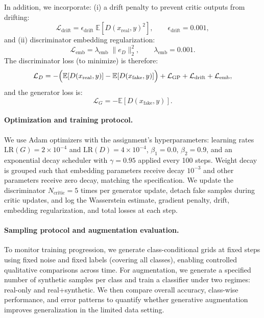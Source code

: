 In addition, we incorporate:
(i) a drift penalty to prevent critic outputs from drifting:
\[
\mathcal{L}_{\mathrm{drift}}=\epsilon_{\mathrm{drift}}\;\mathbb{E}\left[D(x_{\mathrm{real}},y)^2\right],\qquad \epsilon_{\mathrm{drift}}=0.001,
\]
and (ii) discriminator embedding regularization:
\[
\mathcal{L}_{\mathrm{emb}}=\lambda_{\mathrm{emb}}\;\|e_D\|_2^2,\qquad \lambda_{\mathrm{emb}}=0.001.
\]
The discriminator loss (to minimize) is therefore:
\[
\mathcal{L}_D=
-\Bigl(\mathbb{E}[D(x_{\mathrm{real}},y)]-\mathbb{E}[D(x_{\mathrm{fake}},y)]\Bigr)
+\mathcal{L}_{\mathrm{GP}}+\mathcal{L}_{\mathrm{drift}}+\mathcal{L}_{\mathrm{emb}},
\]
and the generator loss is:
\[
\mathcal{L}_G=-\mathbb{E}[D(x_{\mathrm{fake}},y)].
\]

\paragraph{Optimization and training protocol.}
We use Adam optimizers with the assignment's hyperparameters: learning rates $\mathrm{LR}(G)=2\times10^{-4}$ and $\mathrm{LR}(D)=4\times10^{-4}$, $\beta_1=0.0$, $\beta_2=0.9$, and an exponential decay scheduler with $\gamma=0.95$ applied every 100 steps. Weight decay is grouped such that embedding parameters receive decay $10^{-3}$ and other parameters receive zero decay, matching the specification. We update the discriminator $N_{\mathrm{critic}}=5$ times per generator update, detach fake samples during critic updates, and log the Wasserstein estimate, gradient penalty, drift, embedding regularization, and total losses at each step.

\paragraph{Sampling protocol and augmentation evaluation.}
To monitor training progression, we generate class-conditional grids at fixed steps using fixed noise and fixed labels (covering all classes), enabling controlled qualitative comparisons across time. For augmentation, we generate a specified number of synthetic samples per class and train a classifier under two regimes: real-only and real+synthetic. We then compare overall accuracy, class-wise performance, and error patterns to quantify whether generative augmentation improves generalization in the limited data setting.
